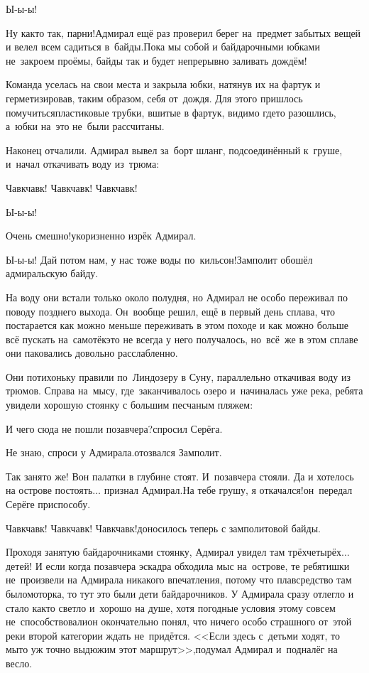 \diagdash Ы-ы-ы! 

\diagdash Ну как\sdash то так, парни!\mdash Адмирал ещё раз проверил берег на~предмет забытых вещей и велел всем садиться в~байды.\mdash Пока мы собой и байдарочными юбками не~закроем проёмы, байды так и будет непрерывно заливать дождём!

Команда уселась на свои места и закрыла юбки, натянув их на фартук и герметизировав, таким образом, себя от~дождя. Для этого пришлось помучиться\mdash пластиковые трубки, вшитые в фартук, видимо где\sdash то разошлись, а~юбки на~это не~были рассчитаны. 

Наконец отчалили. Адмирал вывел за~борт шланг, подсоединённый к~груше, и~начал откачивать воду из~трюма:

\diagdash Чавк\sdash чавк! Чавк\sdash чавк! Чавк\sdash чавк!

\diagdash Ы-ы-ы!

\diagdash Очень смешно!\mdash укоризненно изрёк Адмирал.

\diagdash Ы-ы-ы! Дай потом нам, у нас тоже воды по~кильсон!\mdash Замполит обошёл адмиральскую байду.

На воду они встали только около полудня, но Адмирал не особо переживал по поводу позднего выхода. Он~вообще решил, ещё в первый день сплава, что постарается как можно меньше переживать в этом походе и как можно больше всё пускать на~самотёк\mdash это не всегда у него получалось, но~всё~же в этом сплаве они паковались довольно расслабленно.

Они потихоньку правили по~Линдозеру в Суну, параллельно откачивая воду из трюмов. Справа на~мысу, где~заканчивалось озеро и~начиналась уже река, ребята увидели хорошую стоянку с большим песчаным пляжем:

\diagdash И чего сюда не пошли позавчера?\mdash спросил Серёга.

\diagdash Не знаю, спроси у Адмирала.\mdash отозвался Замполит.

\diagdash Так занято же! Вон палатки в глубине стоят. И~позавчера стояли. Да и хотелось на острове постоять$\ldots$ \mdash признал Адмирал.\mdash На тебе грушу, я откачался!\mdash он~передал Серёге приспособу.

\diagdash Чавк\sdash чавк! Чавк\sdash чавк! Чавк\sdash чавк!\mdash доносилось теперь с замполитовой байды.

Проходя занятую байдарочниками стоянку, Адмирал увидел там трёх\sdash четырёх$\ldots$ детей! И если когда позавчера эскадра обходила мыс на~острове, те ребятишки не~произвели на Адмирала никакого впечатления, потому что плавсредство там было\mdash моторка, то тут это были дети байдарочников. У Адмирала сразу отлегло и стало как\sdash то светло и~хорошо на душе, хотя погодные условия этому совсем не~способствовали\mdash он окончательно понял, что ничего особо страшного от~этой реки второй категории ждать не~придётся. <<Если здесь с~детьми ходят, то мы\sdash то уж точно выдюжим этот маршрут>>,\mdash подумал Адмирал и~подналёг на весло.


